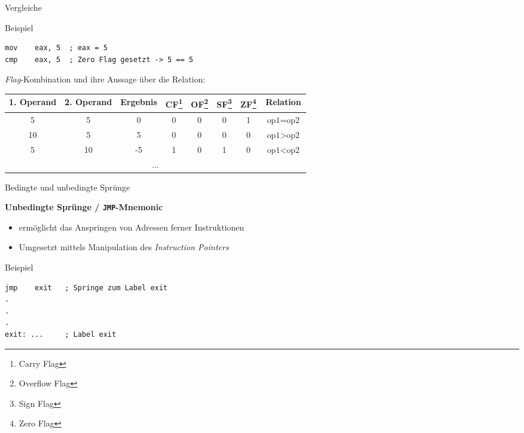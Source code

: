\begin{frame}[fragile]{Vergleiche}

Beispiel
\begin{lstlisting}
mov    eax, 5  ; eax = 5
cmp    eax, 5  ; Zero Flag gesetzt -> 5 == 5
\end{lstlisting}

\makebox{}

\textit{Flag}-Kombination und ihre Aussage über die Relation:

\makebox{}

\begin{small}
\begin{tabular}{|c|c|c|c|c|c|c|c|}
\hline
1. Operand & 2. Operand & Ergebnis & 
CF\footnote{Carry Flag} & 
OF\footnote{Overflow Flag} & 
SF\footnote{Sign Flag} &
ZF\footnote{Zero Flag}
& Relation \\ \hline 
5          & 5          & 0        & 0  & 0  & 0  & 1  & $\text{op1} = \text{op2}$ \\ \hline
10         & 5          & 5        & 0  & 0  & 0  & 0  & $\text{op1} > \text{op2}$ \\ \hline
5          & 10         & -5       & 1  & 0  & 1  & 0  & $\text{op1} < \text{op2}$ \\ \hline
\multicolumn{8}{|c|}{...} \\ \hline
\end{tabular}
\end{small}

\end{frame}

\begin{frame}[fragile]{Bedingte und unbedingte Sprünge}

\begin{center}
\textbf{Unbedingte Sprünge / \texttt{JMP}-Mnemonic}
\end{center}

\begin{itemize}
	\item ermöglicht das Anspringen von Adressen ferner Instruktionen
	\item Umgesetzt mittels Manipulation des \textit{Instruction Pointers}
\end{itemize}

\makebox{}

Beispiel
\begin{lstlisting}
jmp    exit   ; Springe zum Label exit
.
.
.
exit: ...     ; Label exit
\end{lstlisting}
\end{frame}

